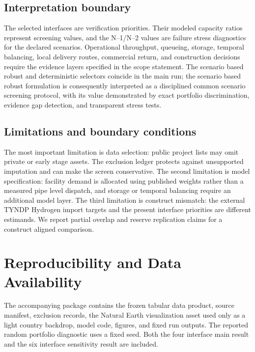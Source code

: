 \documentclass{ieeeaccess}
\begin{document}
\subsection{Interpretation boundary}

The selected interfaces are verification priorities. Their modeled capacity ratios represent screening values, and the N--1/N--2 values are failure stress diagnostics for the declared scenarios. Operational throughput, queueing, storage, temporal balancing, local delivery routes, commercial return, and construction decisions require the evidence layers specified in the scope statement. The scenario based robust and deterministic selectors coincide in the main run; the scenario based robust formulation is consequently interpreted as a disciplined common scenario screening protocol, with its value demonstrated by exact portfolio discrimination, evidence gap detection, and transparent stress tests.

\subsection{Limitations and boundary conditions}

The most important limitation is data selection: public project lists may omit private or early stage assets. The exclusion ledger protects against unsupported imputation and can make the screen conservative. The second limitation is model specification: facility demand is allocated using published weights rather than a measured pipe level dispatch, and storage or temporal balancing require an additional model layer. The third limitation is construct mismatch: the external TYNDP Hydrogen import targets and the present interface priorities are different estimands. We report partial overlap and reserve replication claims for a construct aligned comparison.

\section{Reproducibility and Data Availability}
\label{sec:repro}

The accompanying package contains the frozen tabular data product, source manifest, exclusion records, the Natural Earth visualization asset used only as a light country backdrop, model code, figures, and fixed run outputs. The reported random portfolio diagnostic uses a fixed seed. Both the four interface main result and the six interface sensitivity result are included.
\end{document}
